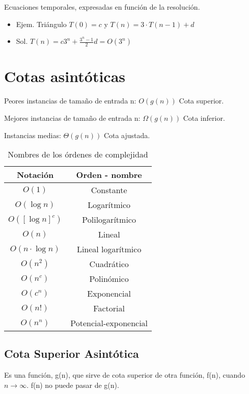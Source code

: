 Ecuaciones temporales, expresadas en función de la resolución.
\begin{itemize}
  \item Ejem. Triángulo $T(0)=c$ y $T(n)=3\cdot T(n-1)+d$
  \item Sol. $T(n)= c3^n+ \frac{3^n-1}{2}d=O(3^n)$
\end{itemize}

\section{Cotas asintóticas}
Peores instancias de tamaño de entrada n: $O(g(n))$ Cota superior.

Mejores instancias de tamaño de entrada n: $\Omega(g(n))$ Cota inferior.

Instancias medias: $\Theta(g(n))$ Cota ajustada.

\begin{table}[H]
  \begin{tabular}{|c|c|}
  \hline
  \rowcolor[HTML]{BFBFBF} 
  Notación                            & Orden - nombre                               \\ \hline
  $O(1)$                                & Constante                                    \\ \hline
  $O(\log n)$                            & Logarítmico                                  \\ \hline
  $O([\log n]^c)$                        & Polilogarítmico                              \\ \hline
  $O(n)$         & Lineal                \\ \hline
  $O(n \cdot \log n)$ & Lineal logarítmico    \\ \hline
  $O(n^2)$       & Cuadrático            \\ \hline
  $O(n^c)$       & Polinómico            \\ \hline
  $O(c^n)$       & Exponencial           \\ \hline
  $O(n!)$        & Factorial             \\ \hline
  $O(n^n)$       & Potencial-exponencial \\ \hline
  \end{tabular}
  \caption{Nombres de los órdenes de complejidad}
\end{table}

\subsection{Cota Superior Asintótica}
Es una función, g(n), que sirve de cota superior de otra función, f(n), cuando $n\rightarrow \infty$. f(n) no puede pasar de g(n).

